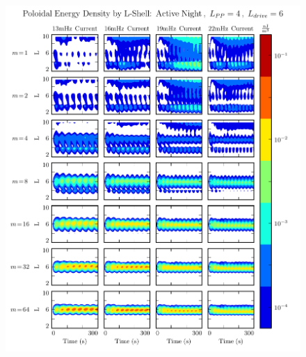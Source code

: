 \begin{figure}[!htb]
    \centering
    \includegraphics[width=\textwidth]{figures/layers_p_3_4_6.pdf}
    \caption[Radial Distribution of Poloidal Energy: Active Night]{
    }
    \label{fig_layers_p_3_4_6}
\end{figure}

